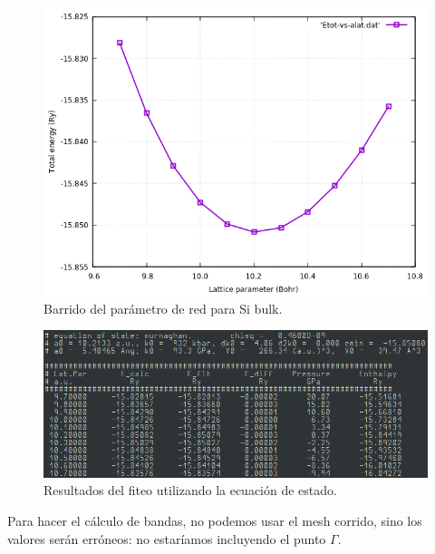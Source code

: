       \begin{figure}[H]
          \centering
          \includegraphics[scale = 0.6]{figs/D2/Si_alat.png}
          \caption{Barrido del parámetro de red para Si bulk.}
      \end{figure}

      \begin{figure}[H]
          \centering
          \includegraphics[scale = 0.6]{figs/D2/Si_mur.png}
          \caption{Resultados del fiteo utilizando la ecuación de estado.}
      \end{figure}

    Para hacer el cálculo de bandas, no podemos usar el mesh corrido, sino los valores serán erróneos: no estaríamos incluyendo el punto $\Gamma$.

